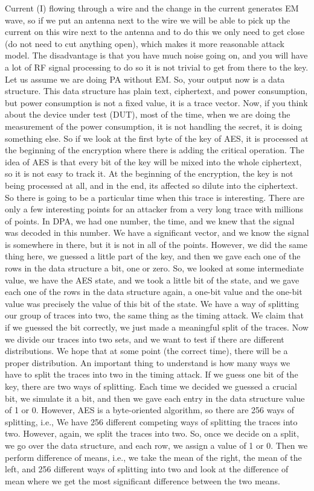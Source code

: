 Current (I) flowing through a wire and the change in the current generates EM
wave, so if we put an antenna next to the wire we will be able to pick up the
current on this wire next to the antenna and to do this we only need to get
close (do not need to cut anything open), which makes it more reasonable attack
model. The disadvantage is that you have much noise going on, and you will
have a lot of RF signal processing to do so it is not trivial to get from there
to the key. Let us assume we are doing PA without EM. So, your output now is a
data structure. This data structure has plain text, ciphertext, and power
consumption, but power consumption is not a fixed value, it is a trace vector.
Now, if you think about the device under test (DUT), most of the time, when we are
doing the measurement of the power consumption, it is not handling the
secret, it is doing something else. So if we look at the first byte of the key of
AES, it is processed at the beginning of the encryption where there is adding the
critical operation. The idea of AES is that every bit of the key will be mixed into
the whole ciphertext, so it is not easy to track it. At the beginning of
the encryption, the key is not being processed at all, and in the end, its affected
so dilute into the ciphertext. So there is going to be a particular time when
this trace is interesting. There
are only a few interesting points for an attacker from a very long trace with millions of points. In DPA, we had one number, the
time, and we knew that the signal was decoded in this number. We have a significant
vector, and we know the signal is somewhere in there, but it is not in all of the
points. However, we did the same thing here, we guessed a little part of the key, and then
we gave each one of the rows in the data structure a bit, one or zero. So, we
looked at some intermediate value, we have the AES state, and we took a
little bit of the state, and we gave each one of the rows in the data structure
again, a one-bit value and the one-bit value was precisely the value of this bit
of the state. We have a way of splitting our group of traces into two,
the same thing as the timing attack. We claim that if we guessed the bit correctly,
we just made a meaningful split of the traces. Now we divide our traces into two
sets, and we want to test if there are different distributions. We hope that at
some point (the correct time), there will be a proper distribution. An important
thing to understand is how many ways we have to split the traces into two in the
timing attack. If we guess one bit of the key, there are two ways of splitting.
Each time we decided we guessed a crucial bit, we simulate it a bit, and then
we gave each entry in the data structure value of 1 or 0. However, AES is a
byte-oriented algorithm, so there are 256 ways of splitting, i.e., We have 256
different competing ways of splitting the traces into two. However, again, we split
the traces into two. So, once we decide on a split, we go over the data structure, and each row, we assign a value of 1 or 0. Then we perform difference of means,
i.e., we take the mean of the right, the mean of the left, and 256
different ways of splitting into two and look at the difference of mean where we
get the most significant difference between the two means.

